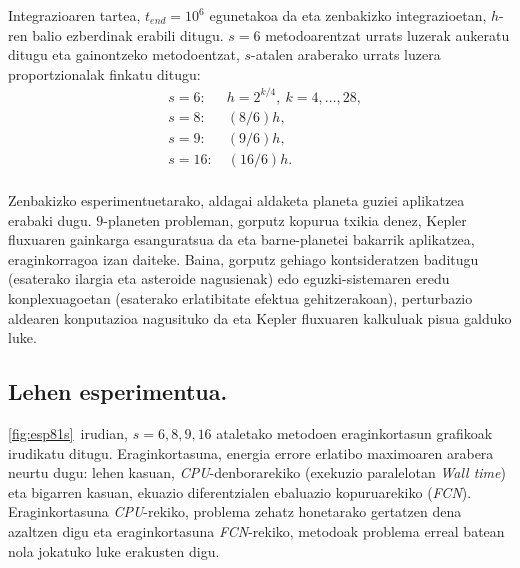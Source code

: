 Integrazioaren tartea, $t_{end}=10^6$ egunetakoa da eta zenbakizko integrazioetan, $h$-ren balio ezberdinak erabili ditugu. $s=6$ metodoarentzat urrats luzerak aukeratu ditugu eta gainontzeko metodoentzat, $s$-atalen araberako urrats luzera proportzionalak finkatu ditugu:
\begin{align*}
&s=6: \quad  \ \ h=2^{k/4}, \ k=4,\dots,28, \\
&s=8: \quad  \ \ (8/6)h, \\
&s=9: \quad  \ \ (9/6)h, \\
&s=16: \quad (16/6)h. \\
\end{align*} 

Zenbakizko esperimentuetarako, aldagai aldaketa planeta guziei aplikatzea erabaki dugu. $9$-planeten probleman, gorputz kopurua txikia denez,  Kepler fluxuaren gainkarga esanguratsua da eta  barne-planetei bakarrik aplikatzea, eraginkorragoa izan daiteke. Baina, gorputz gehiago kontsideratzen baditugu (esaterako ilargia eta asteroide nagusienak) edo eguzki-sistemaren eredu konplexuagoetan (esaterako erlatibitate efektua gehitzerakoan), perturbazio aldearen konputazioa nagusituko da eta Kepler fluxuaren kalkuluak pisua galduko luke. 


\subsection*{Lehen esperimentua.}


\ref{fig:esp81s}~irudian, $s=6,8,9,16$ ataletako metodoen eraginkortasun grafikoak irudikatu ditugu. Eraginkortasuna, energia errore erlatibo maximoaren arabera neurtu dugu: lehen kasuan, \emph{CPU}-denborarekiko (exekuzio paralelotan \emph{Wall time}) eta bigarren kasuan, ekuazio diferentzialen ebaluazio kopuruarekiko (\emph{FCN}). Eraginkortasuna \emph{CPU}-rekiko, problema zehatz honetarako gertatzen dena azaltzen digu eta eraginkortasuna \emph{FCN}-rekiko, metodoak problema erreal batean nola jokatuko luke erakusten digu. 


